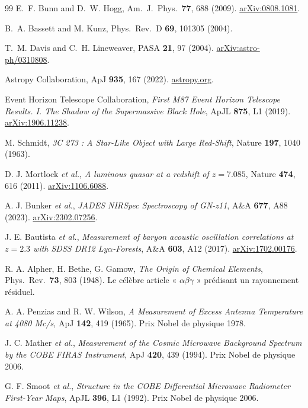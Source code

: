 \documentclass[11pt,a4paper,openany]{report}
\begin{document}
\begin{thebibliography}{99}
E.~F. Bunn and D.~W. Hogg,
Am.\ J.\ Phys.\ \textbf{77}, 688 (2009).
\href{https://arxiv.org/abs/0808.1081}{arXiv:0808.1081}.

B.~A. Bassett and M. Kunz, Phys.\ Rev.\ D \textbf{69}, 101305 (2004).

T.~M. Davis and C.~H. Lineweaver, PASA \textbf{21}, 97 (2004).
\href{https://arxiv.org/abs/astro-ph/0310808}{arXiv:astro-ph/0310808}.

Astropy Collaboration, ApJ \textbf{935}, 167 (2022).
\href{https://www.astropy.org}{astropy.org}.

Event Horizon Telescope Collaboration,
\textit{First M87 Event Horizon Telescope Results. I. The Shadow of the Supermassive Black Hole},
ApJL \textbf{875}, L1 (2019).
\href{https://arxiv.org/abs/1906.11238}{arXiv:1906.11238}.

M. Schmidt,
\textit{3C 273 : A Star-Like Object with Large Red-Shift},
Nature \textbf{197}, 1040 (1963).

D. J. Mortlock \emph{et al.},
\textit{A luminous quasar at a redshift of $z=7.085$},
Nature \textbf{474}, 616 (2011).
\href{https://arxiv.org/abs/1106.6088}{arXiv:1106.6088}.

A. J. Bunker \emph{et al.},
\textit{JADES NIRSpec Spectroscopy of GN-z11},
A\&A \textbf{677}, A88 (2023).
\href{https://arxiv.org/abs/2302.07256}{arXiv:2302.07256}.

J. E. Bautista \emph{et al.},
\textit{Measurement of baryon acoustic oscillation correlations at $z = 2.3$
with SDSS DR12 Ly$\alpha$-Forests},
A\&A \textbf{603}, A12 (2017).
\href{https://arxiv.org/abs/1702.00176}{arXiv:1702.00176}.

R. A. Alpher, H. Bethe, G. Gamow,
\textit{The Origin of Chemical Elements},
Phys.\ Rev.\ \textbf{73}, 803 (1948).
Le célèbre article « $\alpha\beta\gamma$ » prédisant un rayonnement résiduel.

A. A. Penzias and R. W. Wilson,
\textit{A Measurement of Excess Antenna Temperature at 4080 Mc/s},
ApJ \textbf{142}, 419 (1965). Prix Nobel de physique 1978.

J. C. Mather \emph{et al.},
\textit{Measurement of the Cosmic Microwave Background Spectrum by the COBE FIRAS Instrument},
ApJ \textbf{420}, 439 (1994). Prix Nobel de physique 2006.

G. F. Smoot \emph{et al.},
\textit{Structure in the COBE Differential Microwave Radiometer First-Year Maps},
ApJL \textbf{396}, L1 (1992). Prix Nobel de physique 2006.

\end{thebibliography}
\end{document}
